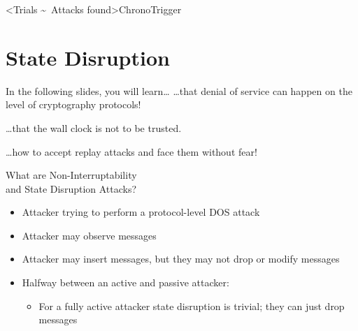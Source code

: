 \interlude[2]<Trials \textasciitilde\ Attacks found>{ChronoTrigger}
\hypertarget{state-disruption}{%
\section{State Disruption}\label{state-disruption}}

\begin{frame}{In the following slides, you will learn…}
\hypertarget{you-will-learn-hybrid}{}
  …that denial of service can happen on the level of cryptography protocols!

  \vspace{2em}
  …that the wall clock is not to be trusted.

  \vspace{2em}
  …how to accept replay attacks and face them without fear!
\end{frame}


\begin{frame}{What are Non-Interruptability\\and State Disruption Attacks?}
  \begin{itemize}
    \item Attacker trying to perform a protocol-level DOS attack
    \item Attacker may observe messages
    \item Attacker may insert messages, but they may not drop or modify messages
    \item Halfway between an active and passive attacker:
    \begin{itemize}
    \item For a fully active attacker state disruption is trivial; they can just drop messages
    \end{itemize}
  \end{itemize}
\end{frame}




